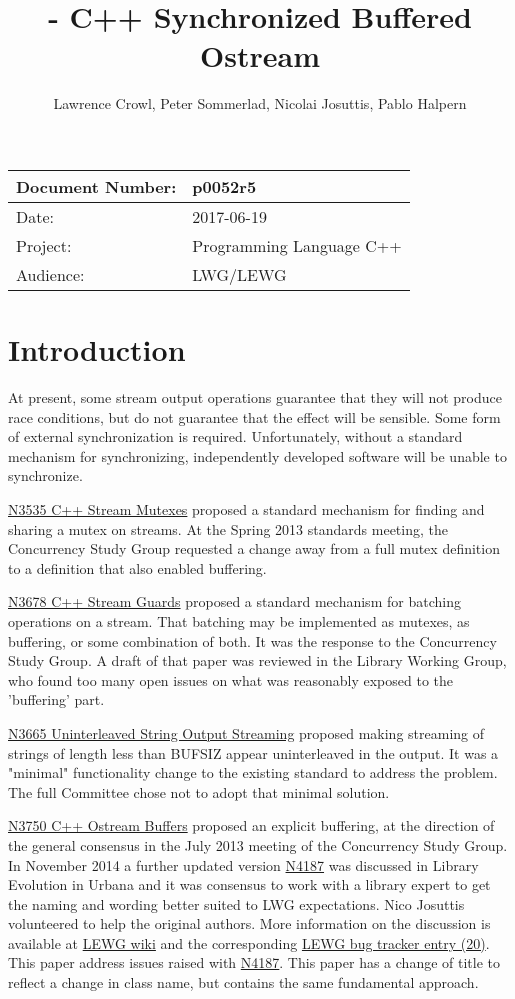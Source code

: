 \documentclass[ebook,11pt,article]{memoir}
\title{\papernumber{} - C++ Synchronized Buffered Ostream}
\author{Lawrence Crowl, Peter Sommerlad, Nicolai Josuttis, Pablo Halpern}
\date{\paperdate}                %
\newcommand{\papernumber}{p0052r5}
\newcommand{\paperdate}{2017-06-19}
\begin{document}
\maketitle
\begin{center}
\begin{tabular}[t]{|l|l|}\hline 
Document Number:&  \papernumber \\\hline
Date: & \paperdate \\\hline
Project: & Programming Language C++\\\hline 
Audience: & LWG/LEWG\\\hline
\end{tabular}
\end{center}
\chapter{Introduction}
At present, some stream output operations guarantee that they will not produce race conditions, but do not guarantee that the effect will be sensible. Some form of external synchronization is required. Unfortunately, without a standard mechanism for synchronizing, independently developed software will be unable to synchronize.

\href{https://wg21.link/n3535}{N3535 C++ Stream Mutexes} proposed a standard mechanism for finding and sharing a mutex on streams. At the Spring 2013 standards meeting, the Concurrency Study Group requested a change away from a full mutex definition to a definition that also enabled buffering.

\href{https://wg21.link/N3678}{N3678 C++ Stream Guards} proposed a standard mechanism for batching operations on a stream. That batching may be implemented as mutexes, as buffering, or some combination of both. It was the response to the Concurrency Study Group. A draft of that paper was reviewed in the Library Working Group, who found too many open issues on what was reasonably exposed to the 'buffering' part.

\href{https://wg21.link/N3665}{N3665 Uninterleaved String Output Streaming} proposed making streaming of strings of length less than BUFSIZ appear uninterleaved in the output. It was a "minimal" functionality change to the existing standard to address the problem. The full Committee chose not to adopt that minimal solution.

\href{https://wg21.link/N3750}{N3750 C++ Ostream Buffers} proposed an explicit buffering, at the direction of the general consensus in the July 2013 meeting of the Concurrency Study Group. In November 2014 a further updated version \href{https://wg21.link/N4187}{N4187} was discussed in Library Evolution in Urbana and it was consensus to work with a library expert to get the naming and wording better suited to LWG expectations. Nico Josuttis volunteered to help the original authors. More information on the discussion is available at \href{http://wiki.edg.com/twiki/bin/view/Wg21urbana-champaign/N4187}{LEWG wiki} and the corresponding \href{https://issues.isocpp.org/show_bug.cgi?id=20}{LEWG bug tracker entry (20)}. This paper address issues raised with \href{https://wg21.link/N4187}{N4187}. This paper has a change of title to reflect a change in class name, but contains the same fundamental approach.
\end{document}
